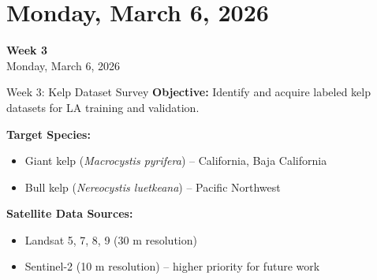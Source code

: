 \documentclass[10pt,xcolor={table,dvipsnames},t]{beamer}
\begin{document}
\section{Monday, March 6, 2026}

\begin{frame}
\centering
\vfill
{\Large\textbf{Week 3}}\\[1em]
{\large Monday, March 6, 2026}
\vfill
\end{frame}

\begin{frame}{Week 3: Kelp Dataset Survey}
\small
\textbf{Objective:} Identify and acquire labeled kelp datasets for LA training and validation.

\vspace{0.3em}
\textbf{Target Species:}
\begin{itemize}
  \item Giant kelp (\textit{Macrocystis pyrifera}) -- California, Baja California
  \item Bull kelp (\textit{Nereocystis luetkeana}) -- Pacific Northwest
\end{itemize}

\vspace{0.3em}
\textbf{Satellite Data Sources:}
\begin{itemize}
  \item Landsat 5, 7, 8, 9 (30 m resolution)
  \item Sentinel-2 (10 m resolution) -- higher priority for future work
\end{itemize}

\end{frame}
\end{document}
